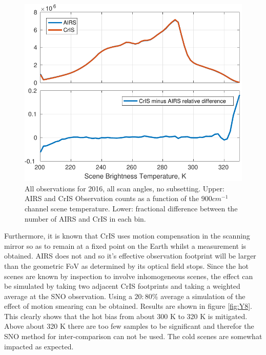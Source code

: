 \documentclass[twocolumn,10pt]{article}
\begin{document}
\begin{figure}[htb]
\centering
\includegraphics[width=\linewidth]{./figs/full_scan_land_2016_all_mod.pdf}
\caption{\label{fig:orgparagraph18}
  All observations for 2016, all scan angles, no subsetting. Upper: AIRS and CrIS Observation counts as a function of the $900 cm^{-1}$ channel scene temperature. Lower: fractional difference between the number of AIRS and CrIS in each bin.}
\label{fig:Y7}
\end{figure}

Furthermore, it is known that CrIS uses motion compensation in the scanning mirror so as to remain at a fixed point on the Earth whilst a measurement is obtained. AIRS does not and so it's effective observation footprint will be larger than the geometric FoV as determined by its optical field stops. Since the hot scenes are known by inspection to involve inhomogeneous scenes, the effect can be simulated by taking two adjacent CrIS footprints and taking a weighted average at the SNO observation. Using a $20:80 \% $ average a simulation of the effect of motion smearing can be obtained. Results are shown in figure \ref{fig:Y8}. This clearly shows that the hot bias from about 300 K to 320 K is mitigated. Above about 320 K there are too few samples to be significant and therefor the SNO method for inter-comparison can not be used. The cold scenes are somewhat impacted as expected.
\end{document}
